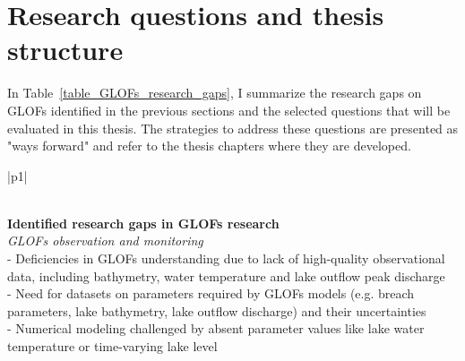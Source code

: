 \section{Research questions and thesis structure}


In Table~\ref{table_GLOFs_research_gaps}, I summarize the research gaps on GLOFs identified in the previous sections and the selected questions that will be evaluated in this thesis. The strategies to address these questions are presented as "ways forward" and refer to the thesis chapters where they are developed.


\begin{longtable}{ |p{}| } 
\caption{Summary of the research gaps on GLOFs identified in this Introduction (with key supporting references) and proposed ways forward assessed in this thesis.}\\
\hline
\textbf{Identified research gaps in GLOFs research}  \\
\hline
\textit{GLOFs observation and monitoring} \\
\hline
- Deficiencies in GLOFs understanding due to lack of high-quality observational data, including bathymetry, water temperature and lake outflow peak discharge {\citep{Roberts2005,Huss&al2007}} \\
- Need for datasets on parameters required by GLOFs models (e.g. breach parameters, lake bathymetry, lake outflow discharge) and their uncertainties {\citep{Emmer&al2022,Zhang&al2024}} \\
- Numerical modeling challenged by absent parameter values like lake water temperature or time-varying lake level {\citep{Carrivick&al2020,Zhang&al2024}} \\

\end{longtable}
